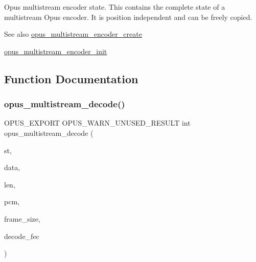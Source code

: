 Opus multistream encoder state. This contains the complete state of a multistream Opus encoder. It is position independent and can be freely copied. \begin{DoxySeeAlso}{See also}
\hyperlink{group__opus__multistream_ga984c19f4faa4db82370eb907f8eaf452}{opus\+\_\+multistream\+\_\+encoder\+\_\+create} 

\hyperlink{group__opus__multistream_gaf9045180b3a93d7cc3d1197859b767a8}{opus\+\_\+multistream\+\_\+encoder\+\_\+init} 
\end{DoxySeeAlso}


\subsection{Function Documentation}
\mbox{\label{group__opus__multistream_ga2db65790cd7e0890a031b2eb17452d7b}} 
\subsubsection{\texorpdfstring{opus\+\_\+multistream\+\_\+decode()}{opus\_multistream\_decode()}}
{\footnotesize\ttfamily O\+P\+U\+S\+\_\+\+E\+X\+P\+O\+RT O\+P\+U\+S\+\_\+\+W\+A\+R\+N\+\_\+\+U\+N\+U\+S\+E\+D\+\_\+\+R\+E\+S\+U\+LT int opus\+\_\+multistream\+\_\+decode (\begin{DoxyParamCaption}\item[{\hyperlink{group__opus__multistream_gad3497495deb9a8ace82e76cd4f93e0e4}{Opus\+M\+S\+Decoder} $\ast$}]{st,  }\item[{\hyperlink{zconf_8h_a2c212835823e3c54a8ab6d95c652660e}{const} unsigned char $\ast$}]{data,  }\item[{\hyperlink{opus__types_8h_aa4d309d6f80b99dbabebc8f98879ab9a}{opus\+\_\+int32}}]{len,  }\item[{\hyperlink{opus__types_8h_acc9ed7cf60479eb81f9648c6ec27dc26}{opus\+\_\+int16} $\ast$}]{pcm,  }\item[{int}]{frame\+\_\+size,  }\item[{int}]{decode\+\_\+fec }\end{DoxyParamCaption})}

